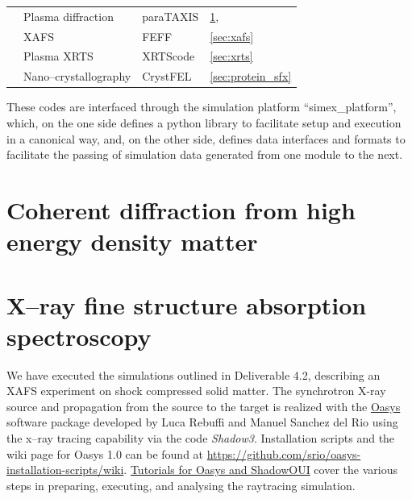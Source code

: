 \documentclass[12pt]{scrartcl}
\begin{document}
\begin{table}
\begin{center}
\begin{tabular}[ht]{|l|l|l|l|}
      & Plasma diffraction              & paraTAXIS             &
      \ref{sec:plasma_diffraction},\cite{EUCALL_SIMEX_D4.1,Kluge2016, Garten2017}  \\
      & XAFS                            & FEFF                  & \ref{sec:xafs} \cite{EUCALL_SIMEX_D4.2,Torchio2016}  \\
      & Plasma XRTS                     & XRTScode              & \ref{sec:xrts} \cite{Fortmann2009d}               \\
      & Nano--crystallography           & CrystFEL              & \ref{sec:protein_sfx}         \\
    \hline
  \end{tabular}
  \end{center}
\end{table}

These codes are interfaced through the simulation platform ``simex\_platform'', which,
on the one side defines a python library to facilitate setup
and execution in a canonical way, and, on the other side, defines data interfaces
and formats to facilitate the passing of simulation data generated from one
module to the next.

\section{Coherent diffraction from high energy density matter}\label{sec:plasma_diffraction}


\section{X--ray fine structure absorption spectroscopy\label{sec:xafs}}
%
We have executed the simulations outlined in Deliverable
4.2\cite{EUCALL_SIMEX_D4.2}, describing an XAFS experiment on shock compressed
solid matter.
The synchrotron X-ray source and propagation from the source to the target is
realized with the \href{http://ftp.esrf.eu/pub/scisoft/Oasys/readme.html}{Oasys}
software package developed by Luca Rebuffi and Manuel Sanchez del Rio
 using the x--ray tracing
capability via the code \textit{Shadow3}. Installation scripts and the wiki page for Oasys 1.0 can be
found at
\href{https://github.com/srio/oasys-installation-scripts/wiki}{https://github.com/srio/oasys-installation-scripts/wiki}.
\href{https://github.com/srio/ShadowOui-Tutorial}{Tutorials for
Oasys and ShadowOUI} cover the various steps in preparing, executing, and
analysing the raytracing simulation.
\end{document}
